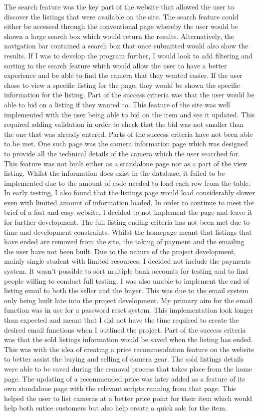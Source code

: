 The search feature was the key part of the website that allowed the user to discover the listings that were available on the site. The search feature could either be accessed through the conventional page whereby the user would be shown a large search box which would return the results. Alternatively, the navigation bar contained a search box that once submitted would also show the results. If I was to develop the program further, I would look to add filtering and sorting to the search feature which would allow the user to have a better experience and be able to find the camera that they wanted easier. 
If the user chose to view a specific listing for the page, they would be shown the specific information for the listing. Part of the success criteria was that the user would be able to bid on a listing if they wanted to. This feature of the site was well implemented with the user being able to bid on the item and see it updated. This required adding validation in order to check that the bid was not smaller than the one that was already entered.
Parts of the success criteria have not been able to be met. One such page was the camera information page which was designed to provide all the technical details of the camera which the user searched for. This feature was not built either as a standalone page nor as a part of the view listing. Whilst the information does exist in the database, it failed to be implemented due to the amount of code needed to load each row from the table. In early testing, I also found that the listings page would load considerably slower even with limited amount of information loaded. In order to continue to meet the brief of a fast and easy website, I decided to not implement the page and leave it for further development. 
The full listing ending criteria has not been met due to time and development constraints. Whilst the homepage meant that listings that have ended are removed from the site, the taking of payment and the emailing the user have not been built. Due to the nature of the project development, mainly single student with limited resources, I decided not include the payments system. It wasn’t possible to sort multiple bank accounts for testing and to find people willing to conduct full testing. I was also unable to implement the end of listing email to both the seller and the buyer. This was due to the email system only being built late into the project development. My primary aim for the email function was in use for a password reset system. This implementation look longer than expected and meant that I did not have the time required to create the desired email functions when I outlined the project. 
Part of the success criteria was that the sold listings information would be saved when the listing has ended. This was with the idea of creating a price recommendation feature on the website to better assist the buying and selling of camera gear. The sold listings details were able to be saved during the removal process that takes place from the home page. The updating of a recommended price was later added as a feature of its own standalone page with the relevant scripts running from that page. This helped the user to list cameras at a better price point for their item which would help both entice customers but also help create a quick sale for the item. 

